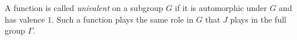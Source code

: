 A function is called \textit{univalent} on a subgroup $G$ if it is automorphic under $G$ and has valence $1$. Such a function plays the same role in $G$ that $J$ plays in the full group $\Gamma$.
